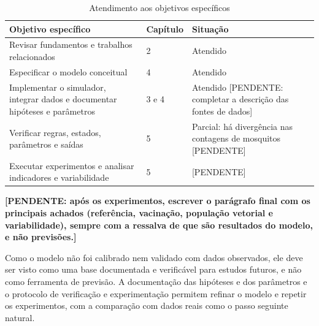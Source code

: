 \begin{table}[htb]
    \centering
    \caption{Atendimento aos objetivos específicos}
    \label{tab:objetivos}
    \begin{tabular}{p{7.4cm} p{1.8cm} p{4.6cm}}
        \hline
        \textbf{Objetivo específico} & \textbf{Capítulo} & \textbf{Situação} \\
        \hline
        Revisar fundamentos e trabalhos relacionados & 2 & Atendido \\
        Especificar o modelo conceitual & 4 & Atendido \\
        Implementar o simulador, integrar dados e documentar hipóteses e parâmetros & 3 e 4 & Atendido [PENDENTE: completar a descrição das fontes de dados] \\
        Verificar regras, estados, parâmetros e saídas & 5 & Parcial: há divergência nas contagens de mosquitos [PENDENTE] \\
        Executar experimentos e analisar indicadores e variabilidade & 5 & [PENDENTE] \\
        \hline
    \end{tabular}
\end{table}

\textbf{[PENDENTE: após os experimentos, escrever o parágrafo final com os principais achados (referência, vacinação, população vetorial e variabilidade), sempre com a ressalva de que são resultados do modelo, e não previsões.]}

Como o modelo não foi calibrado nem validado com dados observados, ele deve ser visto como uma base documentada e verificável para estudos futuros, e não como ferramenta de previsão. A documentação das hipóteses e dos parâmetros e o protocolo de verificação e experimentação permitem refinar o modelo e repetir os experimentos, com a comparação com dados reais como o passo seguinte natural.